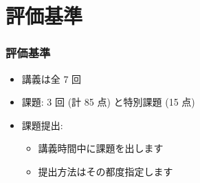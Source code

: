 \section{評価基準}
\begin{frame}
\frametitle{評価基準}
  \begin{itemize}
\item 講義は全 7 回
\item 課題: 3 回 (計 85 点) と特別課題 (15 点)
\item 課題提出: 
    \begin{itemize}
\item 講義時間中に課題を出します
\item 提出方法はその都度指定します
    \end{itemize}
  \end{itemize}
\end{frame}
